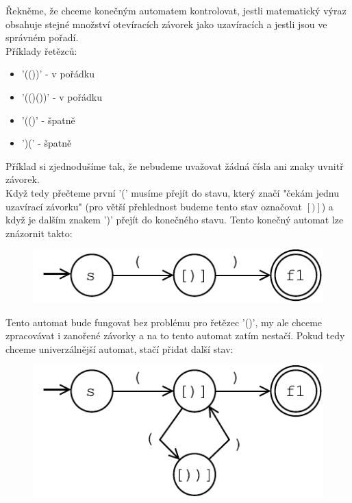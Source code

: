 \begin{exmp}
  \label{exmp:brackets}

  Řekněme, že chceme konečným automatem kontrolovat,
  jestli matematický výraz obsahuje stejné množství
  otevíracích závorek jako uzavíracích a jestli jsou ve správném pořadí.\\
  Příklady řetězců:
  \begin{itemize}
    \item '(())' - v pořádku
    \item '(()())' - v pořádku
    \item '(()' - špatně
    \item ')(' - špatně
  \end{itemize}

  Příklad si zjednodušíme tak, že nebudeme uvažovat žádná čísla ani znaky uvnitř
  závorek.\\

  Když tedy přečteme první '(' musíme přejít do stavu, který značí
  "čekám jednu uzavírací závorku" (pro větší přehlednost budeme tento stav označovat $[)]$)
  a když je dalším znakem ')' přejít do konečného stavu.
  Tento konečný automat lze znázornit takto:

  \begin{figure}[H]
    \centering
    \includegraphics{fig/finiteAutomat2.pdf}
  \end{figure}

  Tento automat bude fungovat bez problému pro řetězec '()',
  my ale chceme zpracovávat i zanořené závorky a na to tento automat zatím nestačí.
  Pokud tedy chceme univerzálnější automat, stačí přidat další stav:

  \begin{figure}[H]
    \centering
    \includegraphics{fig/finiteAutomat2_1.pdf}
  \end{figure}


\end{exmp}

